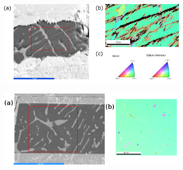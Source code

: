 \begin{figure}[h]
\centering
\begin{subfigure}{\textwidth}
  \centering
  \includegraphics[width=\linewidth]{fig/ebsd.png}
  \label{fig:sfig1}
\end{subfigure}%

\begin{subfigure}{\textwidth}
  \centering
  \includegraphics[width=\linewidth]{fig/ebsd_machinepolish.png}
  \label{fig:sfig2}
\end{subfigure}%

\caption{}
\label{fig:ebsd}
\end{figure}


